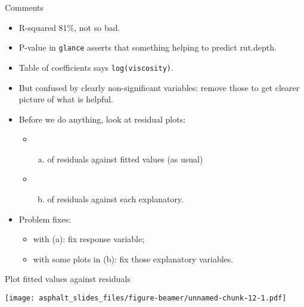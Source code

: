 \begin{frame}[fragile]{Comments}
\protect\hypertarget{comments}{}
\begin{itemize}
\tightlist
\item
  R-squared 81\%, not so bad.
\item
  P-value in \texttt{glance} asserts that something helping to predict
  rut.depth.
\item
  Table of coefficients says \texttt{log(viscosity)}.
\item
  But confused by clearly non-significant variables: remove those to get
  clearer picture of what is helpful.
\item
  Before we do anything, look at residual plots:

  \begin{itemize}
  \item
    \begin{enumerate}
    [(a)]
    \tightlist
    \item
      of residuals against fitted values (as usual)
    \end{enumerate}
  \item
    \begin{enumerate}
    [(a)]
    \setcounter{enumi}{1}
    \tightlist
    \item
      of residuals against each explanatory.
    \end{enumerate}
  \end{itemize}
\item
  Problem fixes:

  \begin{itemize}
  \tightlist
  \item
    with (a): fix response variable;
  \item
    with some plots in (b): fix those explanatory variables.
  \end{itemize}
\end{itemize}
\end{frame}

\begin{frame}[fragile]{Plot fitted values against residuals}
\protect\hypertarget{plot-fitted-values-against-residuals}{}
\begin{Shaded}
\begin{Highlighting}[]
\NormalTok{, }\NormalTok{(}\OperatorTok{+}\StringTok{ }\NormalTok{()}
\end{Highlighting}
\end{Shaded}

\texttt{[image: asphalt\_slides\_files/figure-beamer/unnamed-chunk-12-1.pdf]}
\end{frame}

